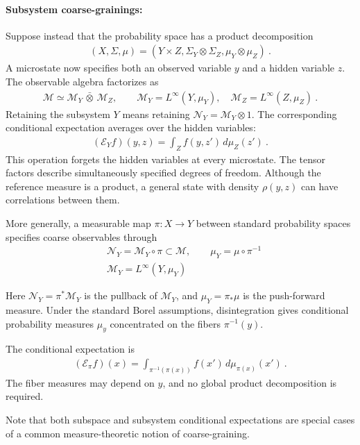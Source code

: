 \documentclass[a4paper,11pt]{article}
\theoremstyle{definition}
\newcommand{\nn}{\nonumber}
\begin{document}
\paragraph{Subsystem coarse-grainings:}
Suppose instead that the probability space has a product decomposition
\begin{align}
    (X,\Sigma,\mu)=(Y\times Z,\Sigma_Y\otimes\Sigma_Z,\mu_Y\otimes\mu_Z)\ .
\end{align}
A microstate now specifies both an observed variable $y$ and a hidden variable $z$. The observable algebra factorizes as
\begin{align}
    \mathcal M\simeq\mathcal M_Y\,\bar\otimes\,\mathcal M_Z,
    \qquad \mathcal M_Y=L^\infty(Y,\mu_Y),\quad
    \mathcal M_Z=L^\infty(Z,\mu_Z)\ .
\end{align}
Retaining the subsystem $Y$ means retaining $\mathcal N_Y=\mathcal M_Y\otimes 1$. The corresponding conditional expectation averages over the hidden variables:
\begin{align}
    (\mathcal{E}_Y f)(y,z)=\int_Z f(y,z')\,d\mu_Z(z')\ .
\end{align}
This operation forgets the hidden variables at every microstate. The tensor factors describe simultaneously specified degrees of freedom. Although the reference measure is a product, a general state with density $\rho(y,z)$ can have correlations between them.

More generally, a measurable map $\pi:X\to Y$ between standard probability spaces specifies coarse observables through
\begin{align}
    &\mathcal N_Y=\mathcal M_Y\circ \pi\subset \mathcal M,
    \qquad \mu_Y=\mu\circ \pi^{-1}\nn\\
    &\mathcal M_Y=L^\infty(Y,\mu_Y)
\end{align}

Here $\mathcal N_Y=\pi^*\mathcal M_Y$ is the pullback of $\mathcal M_Y$, and $\mu_Y=\pi_*\mu$ is the
push-forward measure. Under the standard Borel assumptions, disintegration gives
conditional probability measures $\mu_y$ concentrated on the fibers $\pi^{-1}(y)$.

The conditional expectation is
\begin{align}
    (\mathcal{E}_\pi f)(x)=\int_{\pi^{-1}(\pi(x))}f(x')\,d\mu_{\pi(x)}(x')\ .
\end{align}
The fiber measures may depend on $y$, and no global product decomposition is required.

Note that both subspace and subsystem conditional expectations are special cases of a common measure-theoretic notion of coarse-graining.
\end{document}
